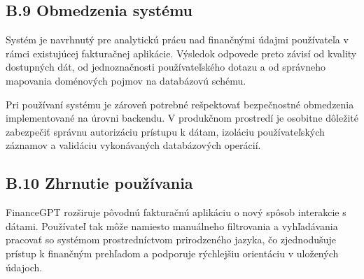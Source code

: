 \subsection*{B.9 Obmedzenia systému}

Systém je navrhnutý pre analytickú prácu nad finančnými údajmi používateľa v rámci
existujúcej fakturačnej aplikácie. Výsledok odpovede preto závisí od kvality
dostupných dát, od jednoznačnosti používateľského dotazu a od správneho mapovania
doménových pojmov na databázovú schému.

Pri používaní systému je zároveň potrebné rešpektovať bezpečnostné obmedzenia implementované
na úrovni backendu. V produkčnom prostredí je osobitne dôležité zabezpečiť
správnu autorizáciu prístupu k dátam, izoláciu používateľských záznamov a validáciu
vykonávaných databázových operácií.

\subsection*{B.10 Zhrnutie používania}

FinanceGPT rozširuje pôvodnú fakturačnú aplikáciu o nový spôsob interakcie s
dátami. Používateľ tak môže namiesto manuálneho filtrovania a vyhľadávania pracovať
so systémom prostredníctvom prirodzeného jazyka, čo zjednodušuje prístup k
finančným prehľadom a podporuje rýchlejšiu orientáciu v uložených údajoch.